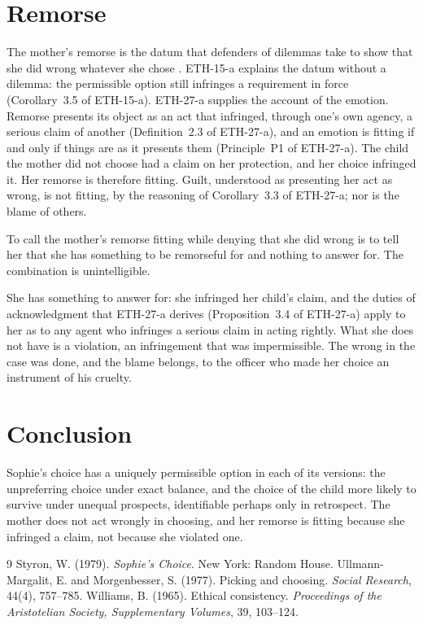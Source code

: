 \documentclass{situationist-preprint}
\begin{document}
\section{Remorse}

The mother's remorse is the datum that defenders of dilemmas take to show that she did wrong whatever she chose \citep{Williams1965}. ETH-15-a explains the datum without a dilemma: the permissible option still infringes a requirement in force (Corollary~3.5 of ETH-15-a). ETH-27-a supplies the account of the emotion. Remorse presents its object as an act that infringed, through one's own agency, a serious claim of another (Definition~2.3 of ETH-27-a), and an emotion is fitting if and only if things are as it presents them (Principle~P1 of ETH-27-a). The child the mother did not choose had a claim on her protection, and her choice infringed it. Her remorse is therefore fitting. Guilt, understood as presenting her act as wrong, is not fitting, by the reasoning of Corollary~3.3 of ETH-27-a; nor is the blame of others.

\begin{objection}
To call the mother's remorse fitting while denying that she did wrong is to tell her that she has something to be remorseful for and nothing to answer for. The combination is unintelligible.
\end{objection}

\begin{reply}
She has something to answer for: she infringed her child's claim, and the duties of acknowledgment that ETH-27-a derives (Proposition~3.4 of ETH-27-a) apply to her as to any agent who infringes a serious claim in acting rightly. What she does not have is a violation, an infringement that was impermissible. The wrong in the case was done, and the blame belongs, to the officer who made her choice an instrument of his cruelty.
\end{reply}

\section{Conclusion}

Sophie's choice has a uniquely permissible option in each of its versions: the unpreferring choice under exact balance, and the choice of the child more likely to survive under unequal prospects, identifiable perhaps only in retrospect. The mother does not act wrongly in choosing, and her remorse is fitting because she infringed a claim, not because she violated one.

\begin{thebibliography}{9}\small
{} Styron, W. (1979). \emph{Sophie's Choice}. New York: Random House.
 Ullmann-Margalit, E. and Morgenbesser, S. (1977). Picking and choosing. \emph{Social Research}, 44(4), 757--785.
 Williams, B. (1965). Ethical consistency. \emph{Proceedings of the Aristotelian Society, Supplementary Volumes}, 39, 103--124.
\end{thebibliography}
\end{document}
